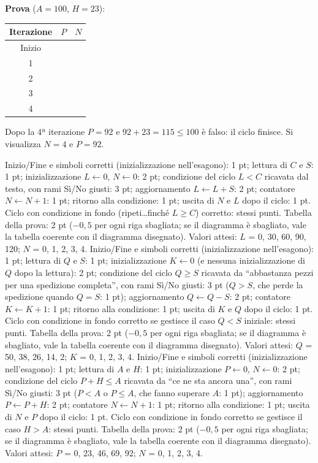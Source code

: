 \begin{esercizio}[14]
\begin{solution}
{  \textbf{Prova} ($A = 100$, $H = 23$):
\begin{center}\renewcommand{\arraystretch}{1.1}
\begin{tabular}{|c|>{\centering\arraybackslash}p{2.5cm}|>{\centering\arraybackslash}p{2.5cm}|}\hline
  Iterazione & $P$ & $N$\\\hline
  Inizio & 0 & 0\\\hline
  1 & 23 & 1\\\hline
  2 & 46 & 2\\\hline
  3 & 69 & 3\\\hline
  4 & 92 & 4\\\hline
\end{tabular}\end{center}  Dopo la 4ª iterazione $P = 92$ e $92 + 23 = 115 \leq 100$ è falso: il ciclo finisce. Si visualizza $N = 4$ e $P = 92$.}
  \criterioABC
  {Inizio/Fine e simboli corretti (inizializzazione nell'esagono): 1 pt; lettura di $C$ e $S$: 1 pt;
    inizializzazione $L\gets 0$, $N\gets 0$: 2 pt; condizione del ciclo $L<C$ ricavata dal testo, con
    rami Sì/No giusti: 3 pt; aggiornamento $L\gets L+S$: 2 pt; contatore $N\gets N+1$: 1 pt; ritorno alla
    condizione: 1 pt; uscita di $N$ e $L$ dopo il ciclo: 1 pt. Ciclo con condizione in fondo
    (ripeti\ldots finché $L \geq C$) corretto: stessi punti. Tabella della prova: 2 pt ($-0{,}5$ per ogni riga sbagliata; se il diagramma è sbagliato, vale la tabella coerente con il diagramma disegnato). Valori attesi: $L$ = 0, 30, 60, 90, 120; $N$ = 0, 1, 2, 3, 4.}
  {Inizio/Fine e simboli corretti (inizializzazione nell'esagono): 1 pt; lettura di $Q$ e $S$: 1 pt;
    inizializzazione $K\gets 0$ (e nessuna inizializzazione di $Q$ dopo la lettura): 2 pt; condizione del
    ciclo $Q\geq S$ ricavata da ``abbastanza pezzi per una spedizione completa'', con rami Sì/No giusti:
    3 pt ($Q>S$, che perde la spedizione quando $Q=S$: 1 pt); aggiornamento $Q\gets Q-S$: 2 pt; contatore $K\gets K+1$: 1 pt; ritorno
    alla condizione: 1 pt; uscita di $K$ e $Q$ dopo il ciclo: 1 pt. Ciclo con condizione in fondo
    corretto se gestisce il caso $Q<S$ iniziale: stessi punti. Tabella della prova: 2 pt ($-0{,}5$ per ogni riga sbagliata; se il diagramma è sbagliato, vale la tabella coerente con il diagramma disegnato). Valori attesi: $Q$ = 50, 38, 26, 14, 2; $K$ = 0, 1, 2, 3, 4.}
  {Inizio/Fine e simboli corretti (inizializzazione nell'esagono): 1 pt; lettura di $A$ e $H$: 1 pt;
    inizializzazione $P\gets 0$, $N\gets 0$: 2 pt; condizione del ciclo $P+H\leq A$ ricavata da ``ce ne
    sta ancora una'', con rami Sì/No giusti: 3 pt ($P<A$ o $P\leq A$, che fanno superare $A$: 1 pt);
    aggiornamento $P\gets P+H$: 2 pt; contatore $N\gets N+1$: 1 pt; ritorno alla condizione: 1 pt; uscita
    di $N$ e $P$ dopo il ciclo: 1 pt. Ciclo con condizione in fondo corretto se gestisce il caso $H>A$:
    stessi punti. Tabella della prova: 2 pt ($-0{,}5$ per ogni riga sbagliata; se il diagramma è sbagliato, vale la tabella coerente con il diagramma disegnato). Valori attesi: $P$ = 0, 23, 46, 69, 92; $N$ = 0, 1, 2, 3, 4.}
\end{solution}
\end{esercizio}
